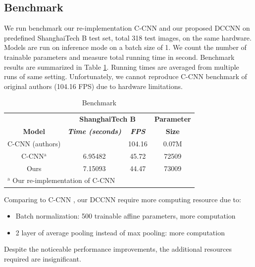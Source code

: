 
\subsection{Benchmark}

We run benchmark our re-implementation C-CNN \cite{9053780} and our proposed DCCNN on predefined ShanghaiTech B test set, total 318 test images, on the same hardware. Models are run on inference mode on a batch size of 1. We count the number of trainable parameters and measure total running time in second. Benchmark results are summarized in Table \ref{tab:benchmark-result}. Running times are averaged from multiple runs of same setting. Unfortunately, we cannot reproduce C-CNN benchmark of original authors \cite{9053780} (104.16 FPS) due to hardware limitations. 

\begin{table}[htbp]
\caption{\label{tab:benchmark-result}  Benchmark}
\begin{center}
\begin{tabular}{|c|c|c|c|}
\hline
\textbf{}&\multicolumn{2}{|c|}{\textbf{ShanghaiTech B}}&\textbf{Parameter} \\
\cline{1-3}
\textbf{Model} & \textbf{\textit{ Time (seconds) }}& \textbf{\textit{FPS}}&\textbf{Size} \\
\hline
C-CNN (authors) &  &  104.16 & 0.07M \\
\hline
C-CNN$^{\mathrm{a}}$  & 6.95482 & 45.72 & 72509   \\
\hline
Ours &  7.15093 & 44.47 & 73009 \\
\hline
\multicolumn{4}{l}{$^{\mathrm{a}}$ Our re-implementation of C-CNN}
\end{tabular}

\end{center}
\end{table}

Comparing to C-CNN \cite{9053780}, our DCCNN require more computing resource due to: 
\begin{itemize}
    \item Batch normalization: 500 trainable affine parameters, more computation
    \item 2 layer of average pooling instead of max pooling: more computation 
\end{itemize}

Despite the noticeable performance improvements, the additional resources required are insignificant.